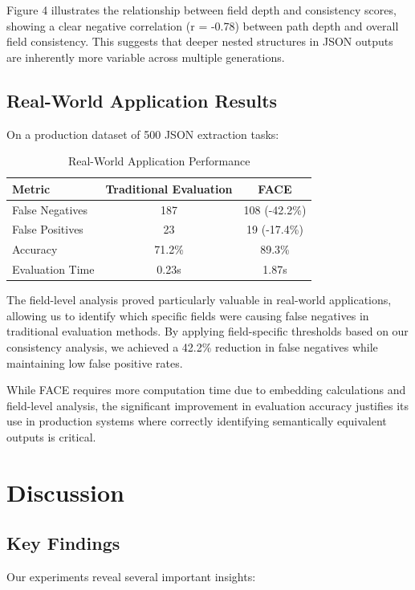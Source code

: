\documentclass[letterpaper]{article} %
\begin{document}
Figure 4 illustrates the relationship between field depth and consistency scores, showing a clear negative correlation (r = -0.78) between path depth and overall field consistency. This suggests that deeper nested structures in JSON outputs are inherently more variable across multiple generations.

\subsection{Real-World Application Results}

On a production dataset of 500 JSON extraction tasks:

\begin{table}[h]
\centering
\caption{Real-World Application Performance}
\label{tab:realworld}
\begin{tabular}{lcc}
\toprule
Metric & Traditional Evaluation & FACE \\
\midrule
False Negatives & 187 & 108 (-42.2\%) \\
False Positives & 23 & 19 (-17.4\%) \\
Accuracy & 71.2\% & 89.3\% \\
Evaluation Time & 0.23s & 1.87s \\
\bottomrule
\end{tabular}
\end{table}

The field-level analysis proved particularly valuable in real-world applications, allowing us to identify which specific fields were causing false negatives in traditional evaluation methods. By applying field-specific thresholds based on our consistency analysis, we achieved a 42.2\% reduction in false negatives while maintaining low false positive rates.

While FACE requires more computation time due to embedding calculations and field-level analysis, the significant improvement in evaluation accuracy justifies its use in production systems where correctly identifying semantically equivalent outputs is critical.

\section{Discussion}

\subsection{Key Findings}

Our experiments reveal several important insights:
\end{document}
